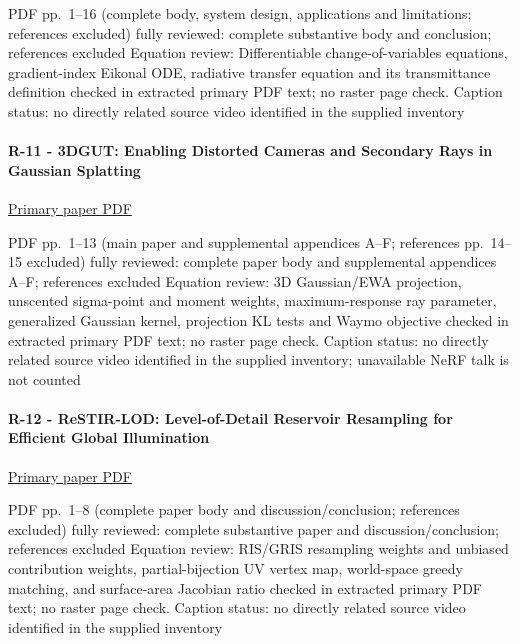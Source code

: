 PDF pp.~1--16 (complete body, system design, applications and limitations; references excluded) fully reviewed: complete substantive body and conclusion; references excluded Equation review: Differentiable change-of-variables equations, gradient-index Eikonal ODE, radiative transfer equation and its transmittance definition checked in extracted primary PDF text; no raster page check. Caption status: no directly related source video identified in the supplied inventory

\paragraph{R-11 - 3DGUT: Enabling Distorted Cameras and Secondary Rays in Gaussian Splatting}\label{r-11---3dgut-enabling-distorted-cameras-and-secondary-rays-in-gaussian-splatting}

\href{https://research.nvidia.com/labs/toronto-ai/3DGUT/res/3DGUT_full_resolution.pdf}{Primary paper PDF}

PDF pp.~1--13 (main paper and supplemental appendices A--F; references pp.~14--15 excluded) fully reviewed: complete paper body and supplemental appendices A--F; references excluded Equation review: 3D Gaussian/EWA projection, unscented sigma-point and moment weights, maximum-response ray parameter, generalized Gaussian kernel, projection KL tests and Waymo objective checked in extracted primary PDF text; no raster page check. Caption status: no directly related source video identified in the supplied inventory; unavailable NeRF talk is not counted

\paragraph{R-12 - ReSTIR-LOD: Level-of-Detail Reservoir Resampling for Efficient Global Illumination}\label{r-12---restir-lod-level-of-detail-reservoir-resampling-for-efficient-global-illumination}

\href{https://research.nvidia.com/labs/rtr/publication/wang2026levelOfDetail/wang2026levelOfDetail.pdf}{Primary paper PDF}

PDF pp.~1--8 (complete paper body and discussion/conclusion; references excluded) fully reviewed: complete substantive paper and discussion/conclusion; references excluded Equation review: RIS/GRIS resampling weights and unbiased contribution weights, partial-bijection UV vertex map, world-space greedy matching, and surface-area Jacobian ratio checked in extracted primary PDF text; no raster page check. Caption status: no directly related source video identified in the supplied inventory

